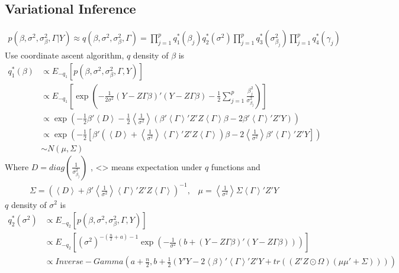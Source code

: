 \documentclass[11pt]{article}
\begin{document}
\subsection{Variational Inference}
\begin{align*}
p(\beta,\sigma^2,\sigma_\beta^2,\Gamma | Y) \approx q(\beta,\sigma^2,\sigma_\beta^2,\Gamma) = \prod_{j=1}^{p}q_1^*(\beta_j)q_2^*(\sigma^2)\prod_{j=1}^p q_3^*(\sigma_{\beta_j}^2)\prod_{j=1}^{p}q_4^*(\gamma_j)
\end{align*}
Use coordinate ascent algorithm, $q$ density of $\beta$ is
\begin{align*}
q_1^*(\beta) &\propto E_{-q_1}\left[p(\beta,\sigma^2,\sigma_\beta^2,\Gamma , Y)\right]\\
&\propto E_{-q_1}\left[\exp\left(-\frac{1}{2\sigma^2}\left(Y - Z\Gamma\beta\right)'\left(Y-Z\Gamma\beta\right) - \frac{1}{2}\sum_{j=1}^{p}\frac{\beta_j^2}{\sigma_{\beta_j}^2}\right)\right]\\
&\propto \exp\left(-\frac{1}{2} \beta'\left<D\right> -\frac{1}{2}\left<\frac{1}{\sigma^2}\right>\left(\beta'\left<\Gamma\right>'Z'Z\left<\Gamma\right>\beta- 2\beta'\left<\Gamma\right>'Z'Y\right)\right)\\
&\propto \exp\left(-\frac{1}{2}\left[\beta'\left(\left<D\right> + \left<\frac{1}{\sigma^2}\right>\left<\Gamma\right>'Z'Z\left<\Gamma\right>\right)\beta -2 \left<\frac{1}{\sigma^2}\right>\beta'\left<\Gamma\right>'Z'Y\right]\right)\\
&\sim N(\mu,\Sigma)
\end{align*}
Where $D = diag(\frac{1}{\sigma_{\beta_j}^2})$ , <> means expectation under $q$ functions and
\begin{align*}
\Sigma = \left(\left<D\right> +\beta' \left<\frac{1}{\sigma^2}\right>\left<\Gamma\right>'Z'Z\left<\Gamma\right>\right)^{-1},\;\;\;\mu = \left<\frac{1}{\sigma^2}\right> \Sigma  \left<\Gamma\right>'Z'Y
\end{align*}
$q$ density of $\sigma^2$ is
\begin{align*}
q_2^*(\sigma^2) &\propto E_{-q_2}\left[p(\beta,\sigma^2,\sigma_\beta^2,\Gamma , Y)\right]\\
&\propto E_{-q_2}\left[\left(\sigma^2\right)^{-\left(\frac{n}{2}+a\right)-1}\exp \left(-\frac{1}{\sigma^2}\left(b+\left(Y-Z\Gamma\beta\right)'\left(Y-Z\Gamma\beta\right)\right)\right) \right]\\
&\propto Inverse-Gamma\left(a+\frac{n}{2}, b+\frac{1}{2}\left(Y'Y - 2\left<\beta\right>'\left<\Gamma\right>'Z'Y + tr\left(\left(Z'Z \odot \Omega\right)\left(\mu \mu'+ \Sigma\right)\right) \right)\right)
\end{align*}
\end{document}

